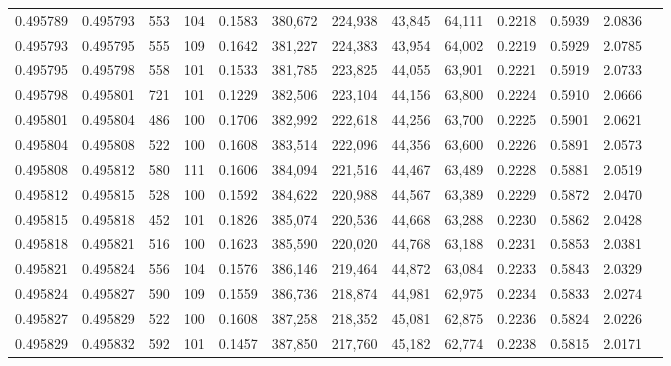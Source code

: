 \begin{tabular}{rrrrrrrrrrrrr}
0.495789 & 0.495793 &   553 & 104 &                                     0.1583 & 380,672 & 224,938 &  43,845 &  64,111 & 0.2218 & 0.5939 & 2.0836 \\
0.495793 & 0.495795 &   555 & 109 &                                     0.1642 & 381,227 & 224,383 &  43,954 &  64,002 & 0.2219 & 0.5929 & 2.0785 \\
0.495795 & 0.495798 &   558 & 101 &                                     0.1533 & 381,785 & 223,825 &  44,055 &  63,901 & 0.2221 & 0.5919 & 2.0733 \\
0.495798 & 0.495801 &   721 & 101 &                                     0.1229 & 382,506 & 223,104 &  44,156 &  63,800 & 0.2224 & 0.5910 & 2.0666 \\
0.495801 & 0.495804 &   486 & 100 &                                     0.1706 & 382,992 & 222,618 &  44,256 &  63,700 & 0.2225 & 0.5901 & 2.0621 \\
0.495804 & 0.495808 &   522 & 100 &                                     0.1608 & 383,514 & 222,096 &  44,356 &  63,600 & 0.2226 & 0.5891 & 2.0573 \\
0.495808 & 0.495812 &   580 & 111 &                                     0.1606 & 384,094 & 221,516 &  44,467 &  63,489 & 0.2228 & 0.5881 & 2.0519 \\
0.495812 & 0.495815 &   528 & 100 &                                     0.1592 & 384,622 & 220,988 &  44,567 &  63,389 & 0.2229 & 0.5872 & 2.0470 \\
0.495815 & 0.495818 &   452 & 101 &                                     0.1826 & 385,074 & 220,536 &  44,668 &  63,288 & 0.2230 & 0.5862 & 2.0428 \\
0.495818 & 0.495821 &   516 & 100 &                                     0.1623 & 385,590 & 220,020 &  44,768 &  63,188 & 0.2231 & 0.5853 & 2.0381 \\
0.495821 & 0.495824 &   556 & 104 &                                     0.1576 & 386,146 & 219,464 &  44,872 &  63,084 & 0.2233 & 0.5843 & 2.0329 \\
0.495824 & 0.495827 &   590 & 109 &                                     0.1559 & 386,736 & 218,874 &  44,981 &  62,975 & 0.2234 & 0.5833 & 2.0274 \\
0.495827 & 0.495829 &   522 & 100 &                                     0.1608 & 387,258 & 218,352 &  45,081 &  62,875 & 0.2236 & 0.5824 & 2.0226 \\
0.495829 & 0.495832 &   592 & 101 &                                     0.1457 & 387,850 & 217,760 &  45,182 &  62,774 & 0.2238 & 0.5815 & 2.0171 \\

\end{tabular}

